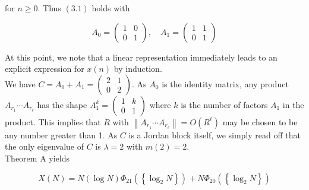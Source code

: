 \documentclass[10pt]{article}
\begin{document}
for $n \geq 0$. Thus $(3.1)$ holds with

$$
A_{0}=\left(\begin{array}{ll}
	1 & 0 \\
	0 & 1
\end{array}\right), \quad A_{1}=\left(\begin{array}{ll}
	1 & 1 \\
	0 & 1
\end{array}\right)
$$

At this point, we note that a linear representation immediately leads to an explicit expression for $x(n)$ by induction.
\\

We have $C=A_{0}+A_{1}=\left(\begin{array}{ll}2 & 1 \\ 0 & 2\end{array}\right)$. As $A_{0}$ is the identity matrix, any product $A_{r_{1}} \cdots A_{r_{\ell}}$ has the shape $A_{1}^{k}=\left(\begin{array}{ll}1 & k \\ 0 & 1\end{array}\right)$ where $k$ is the number of factors $A_{1}$ in the product. This implies that $R$ with $\left\|A_{r_{1}} \cdots A_{r_{\ell}}\right\|=O\left(R^{\ell}\right)$ may be chosen to be any number greater than 1. As $C$ is a Jordan block itself, we simply read off that the only eigenvalue of $C$ is $\lambda=2$ with $m(2)=2$.
\\

Theorem A yields

$$
X(N)=N(\log N) \Phi_{21}\left(\left\{\log _{2} N\right\}\right)+N \Phi_{20}\left(\left\{\log _{2} N\right\}\right)
$$
\end{document}
